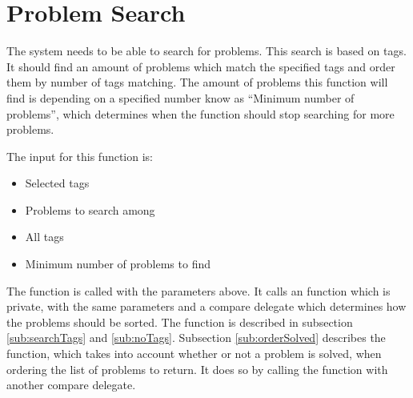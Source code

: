 \section{Problem Search}
The system needs to be able to search for problems.
This search is based on tags.
It should find an amount of problems which match the specified tags and order them by number of tags matching.
The amount of problems this function will find is depending on a specified number know as ``Minimum number of problems'', which determines when the function should stop searching for more problems.

The input for this function is:

\begin{itemize}
	\item Selected tags
	\item Problems to search among
	\item All tags
	\item Minimum number of problems to find
\end{itemize}

The  function is called with the parameters above. It calls an  function which is private, with the same parameters and a compare delegate which determines how the problems should be sorted.
The  function is described in subsection \ref{sub:searchTags} and \ref{sub:noTags}.
Subsection \ref{sub:orderSolved} describes the  function, which takes into account whether or not a problem is solved, when ordering the list of problems to return.
It does so by calling the  function with another compare delegate.

